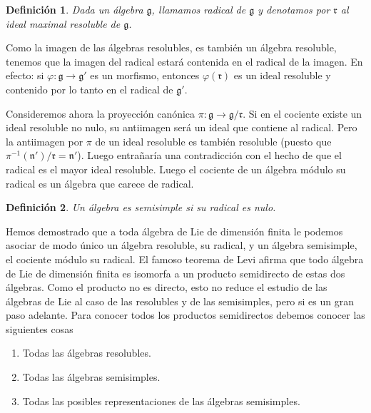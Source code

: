 \documentclass[a4paper,draft,12pt]{article}
\newtheorem{defi}{Definición}[section]%
\newcommand{\g}{\mathfrak{g}}%
\newcommand{\df}[1]{\textsf{\color{blue}#1}}
\begin{document}
\begin{defi}

Dada un álgebra $\g$, llamamos  \df{radical} de $\g$ y denotamos por $\mathfrak{r}$ al ideal maximal resoluble  de $\g$.

\end{defi}

Como la imagen de las álgebras resolubles, es también un álgebra resoluble, tenemos que la imagen del radical estará contenida en el radical de la imagen.  En efecto: si $\varphi:\g \rightarrow \g'$ es un morfismo, entonces $\varphi(\mathfrak{r})$ es un ideal resoluble y contenido por lo tanto en el radical de $\g'$.

Consideremos ahora la proyección canónica $\pi:\g \rightarrow \g/\mathfrak{r}$.  Si en el cociente existe un ideal resoluble no nulo, su antiimagen será un ideal que contiene al radical.  Pero  la antiimagen por $\pi$ de un ideal resoluble es también resoluble (puesto que $\pi^{-1}(\mathfrak{n}')/\mathfrak{r}= \mathfrak{n}'$).  Luego entrañaría una contradicción con el hecho de que el radical es el mayor ideal resoluble. Luego el cociente de un álgebra módulo su radical es un álgebra que carece de radical.

\begin{defi}

Un álgebra es  \df{semisimple} si su radical es nulo.

\end{defi}

Hemos demostrado que a toda álgebra de Lie de dimensión finita le podemos asociar de modo único un álgebra resoluble, su radical, y un álgebra semisimple, el cociente módulo su radical.  El famoso  \df{teorema de Levi} afirma que  todo álgebra de Lie de dimensión finita es isomorfa a un producto semidirecto de estas dos álgebras.  Como el producto no es directo, esto no reduce el estudio de las álgebras de Lie al caso de las resolubles y de las semisimples, pero si es un gran paso adelante.  Para conocer todos los productos semidirectos debemos conocer las siguientes cosas

\begin{enumerate}[\indent 1.- ]

\item Todas las álgebras resolubles.

\item Todas las álgebras semisimples.

\item Todas las posibles representaciones de las álgebras semisimples.

\end{enumerate}
\end{document}
